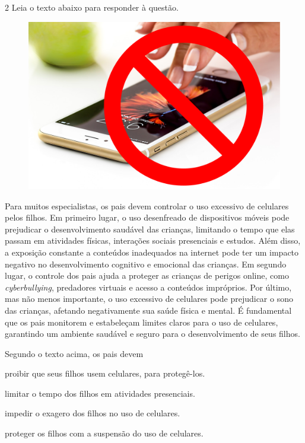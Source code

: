\num{2} Leia o texto abaixo para responder à questão. 

\begin{myquote}

\begin{figure}[H]
\centering
\includegraphics[scale=0.25]{./imgSAEB_7_POR/media/image39.png}
\end{figure} 

Para muitos especialistas, os pais devem controlar o uso excessivo de celulares 
pelos filhos. Em primeiro lugar, o uso desenfreado de dispositivos
móveis pode prejudicar o desenvolvimento saudável das crianças, limitando o
tempo que elas passam em atividades físicas, interações sociais presenciais e
estudos. Além disso, a exposição constante a conteúdos inadequados na internet
pode ter um impacto negativo no desenvolvimento cognitivo e emocional das
crianças. Em segundo lugar, o controle dos pais ajuda a proteger as crianças
de perigos online, como \textit{cyberbullying}, predadores virtuais e acesso a
conteúdos impróprios. Por último, mas não menos importante, o uso excessivo de
celulares pode prejudicar o sono das crianças, afetando negativamente sua
saúde física e mental. É fundamental que os pais monitorem e
estabeleçam limites claros para o uso de celulares, garantindo um ambiente
saudável e seguro para o desenvolvimento de seus filhos.


\end{myquote}

Segundo o texto acima, os pais devem

\begin{escolha}

  \item proibir que seus filhos usem celulares, para protegê-los.
  
  \item limitar o tempo dos filhos em atividades presenciais.
  
  \item impedir o exagero dos filhos no uso de celulares.
  
  \item proteger os filhos com a suspensão do uso de celulares.

\end{escolha}

